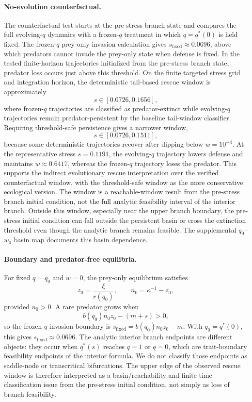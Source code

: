 \documentclass[11pt]{article}
\begin{document}
\paragraph{No-evolution counterfactual.}
The counterfactual test starts at the pre-stress branch state and compares the full evolving-\(q\) dynamics with a frozen-\(q\) treatment in which \(q=q^*(0)\) is held fixed. The frozen-\(q\) prey-only invasion calculation gives \(s_{\mathrm{fixed}}\approx0.0696\), above which predators cannot invade the prey-only state when defense is fixed. In the tested finite-horizon trajectories initialized from the pre-stress branch state, predator loss occurs just above this threshold. On the finite targeted stress grid and integration horizon, the deterministic tail-based rescue window is approximately
\[
s\in[0.0726,0.1656],
\]
where frozen-\(q\) trajectories are classified as predator-extinct while evolving-\(q\) trajectories remain predator-persistent by the baseline tail-window classifier. Requiring threshold-safe persistence gives a narrower window,
\[
s\in[0.0726,0.1511],
\]
because some deterministic trajectories recover after dipping below \(w=10^{-4}\). At the representative stress \(s=0.1191\), the evolving-\(q\) trajectory lowers defense and maintains \(w\approx0.6417\), whereas the frozen-\(q\) trajectory loses the predator. This supports the indirect evolutionary rescue interpretation over the verified counterfactual window, with the threshold-safe window as the more conservative ecological version. The window is a reachable-window result from the pre-stress branch initial condition, not the full analytic feasibility interval of the interior branch. Outside this window, especially near the upper branch boundary, the pre-stress initial condition can fall outside the persistent basin or cross the extinction threshold even though the analytic branch remains feasible. The supplemental \(q_0\)--\(w_0\) basin map documents this basin dependence.

\paragraph{Boundary and predator-free equilibria.}
For fixed \(q=q_0\) and \(w=0\), the prey-only equilibrium satisfies
\[
z_0=\frac{\xi}{r(q_0)},\qquad n_0=\kappa^{-1}-z_0,
\]
provided \(n_0>0\). A rare predator grows when
\[
b(q_0)n_0z_0-(m+s)>0,
\]
so the frozen-\(q\) invasion boundary is \(s_{\mathrm{fixed}}=b(q_0)n_0z_0-m\). With \(q_0=q^*(0)\), this gives \(s_{\mathrm{fixed}}\approx0.0696\). The analytic interior branch endpoints are different objects: they occur when \(q^*(s)\) reaches \(q=1\) or \(q=0\), which are trait-boundary feasibility endpoints of the interior formula. We do not classify those endpoints as saddle-node or transcritical bifurcations. The upper edge of the observed rescue window is therefore interpreted as a basin/reachability and finite-time classification issue from the pre-stress initial condition, not simply as loss of branch feasibility.
\end{document}

